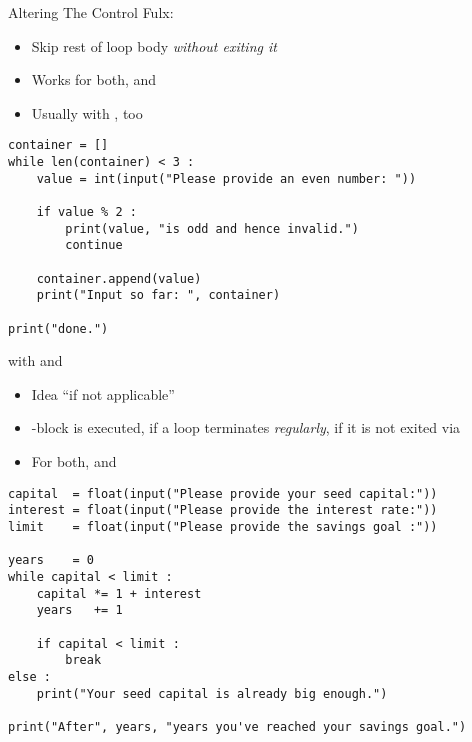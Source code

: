 
\begin{frame}[fragile]{Altering The Control Fulx: }
%
\begin{itemize}
\item Skip rest of loop body \emph{without exiting it}
\item Works for both,  and 
\item Usually with \Thus {}, too
\end{itemize}
%
\begin{codebox}
\begin{verbatim}
container = []
while len(container) < 3 :
    value = int(input("Please provide an even number: "))
    
    if value % 2 :
        print(value, "is odd and hence invalid.")
        continue
        
    container.append(value)
    print("Input so far: ", container)

print("done.")
\end{verbatim}
\end{codebox}
%
\end{frame}


\begin{frame}[fragile]{ with  and }
%
\begin{itemize}
\item Idea \enquote{if not applicable}
\item {}-block is executed, if a loop terminates \emph{regularly}, \ie if it is not exited via 
\item For both,  and 
\end{itemize}
%
\end{frame}


\begin{frame}[fragile]
%
\begin{codebox}
\begin{verbatim}
capital  = float(input("Please provide your seed capital:"))
interest = float(input("Please provide the interest rate:"))
limit    = float(input("Please provide the savings goal :"))

years    = 0
while capital < limit :
    capital *= 1 + interest
    years   += 1
    
    if capital < limit :
        break
else :
    print("Your seed capital is already big enough.")
  
print("After", years, "years you've reached your savings goal.")
\end{verbatim}
\end{codebox}
%
\end{frame}


